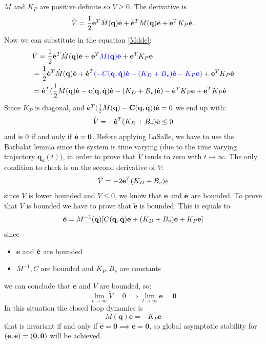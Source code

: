 \documentclass[10pt, a4paper]{report}
\newcommand{\q}{{\mathbf q}}
\begin{document}
$M$ and $K_P$ are positive definite so $V\ge 0$. The derivative is\begin{equation}
    \dot V=\frac{1}{2}\de^T\dot M(\q)\de+\de^T M(\q)\ddot{\mathbf e}+\mathbf e^T K_P\de.
\end{equation}
Now we can substitute in the equation \eqref{Mdde}:\begin{align}
    &\dot V=\frac{1}{2}\de^T\dot M(\q)\de+\de^T \blueText{M(\q)\ddot{\mathbf e}}+\mathbf e^T K_P\de\\ 
    &=\frac{1}{2}\de^T\dot M(\q)\de+\de^T \blueText{(-C(\q,\dq)\de-(K_D+B_v)\de-K_P\mathbf e)}+\mathbf e^T K_P\de\\
    &=\de^T(\frac{1}{2}\dot M(\q)\de-\mathbf c(\q,\dq)\de - (K_D+B_v)\de) -\de^TK_P\mathbf e + \mathbf e^T K_P\de\end{align}
Since $K_P$ is diagonal, and $\de^T(\frac{1}{2}\dot M(\q)-\mathbf C(\q,\dq))\de = 0$ we end up with:\begin{equation}
    \dot V=-{\dot{\mathbf e}}^T(K_D+B_v){\dot{\mathbf e}}\le 0 
\end{equation}
and is $0$ if and only if ${\dot{\mathbf e}}=\mathbf 0$. Before applying LaSalle, we have to use the Barbalat lemma since the system is time varying (due to the time varying trajectory $\q_d(t)$), in order to prove that $\dot V$ tends to zero with $t\rightarrow\infty$. The only condition to check is on the second derivative of $V$:\begin{equation}
    \ddot V=-2{\dot{\mathbf e}}^T(K_D+B_v)\ddot e 
\end{equation}
since $V$ is lower bounded and $\dot V\le 0$, we know that $\mathbf e$ and ${\dot{\mathbf e}}$ are bounded. To prove that $\ddot V$ is bounded we have to prove that $\ddot{\mathbf e}$ is bounded. This is equals to \begin{equation}
    \ddot{\mathbf e}=M^{-1}(\q)[C(\q,\dq)\de+(K_D+B_v)\de+K_P\mathbf e]
\end{equation}
since\begin{itemize}
    \item $\mathbf e$ and ${\dot{\mathbf e}}$ are bounded 
    \item $M^{-1}, C$ are bounded and $K_P,B_v$ are constants 
\end{itemize}
we can conclude that $\ddot{\mathbf e}$ and $\ddot V$ are bounded, so:\begin{equation}
    \lim_{t\rightarrow\infty}\dot V=0\implies \lim_{t\rightarrow\infty}\mathbf e=\mathbf 0
\end{equation}
In this situation the closed loop dynamics is\begin{equation}
    M(\q)\ddot{\mathbf e}=-K_P\mathbf e 
\end{equation}
that is invariant if and only if $\ddot{\mathbf e}=\mathbf 0 \implies \mathbf e = \mathbf 0$, so  global asymptotic stability for $(\mathbf e,{\dot{\mathbf e}})=(\mathbf 0,\mathbf 0)$ will be achieved. \bigskip
\end{document}
